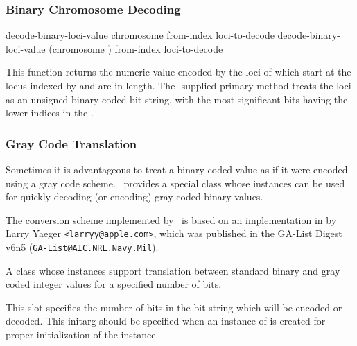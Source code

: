 {\filbreak
{\samepage
\subsubsection{Binary Chromosome Decoding}

\Defgeneric decode-binary-loci-value {chromosome from-index loci-to-decode}
 decode-binary-loci-value {(chromosome )
                                     from-index loci-to-decode}

This function returns the numeric value encoded by the loci of 
which start at the locus indexed by  and are  in
length. The \geco-supplied primary method treats the loci as an unsigned binary
coded bit string, with the most significant bits having the lower indices in the
.
\par}%
\filbreak


\subsubsection{Gray Code Translation}
	\label{section:gray-code-translation}

Sometimes it is advantageous to treat a binary coded value as if it were encoded
using a gray code scheme\cite{ga:gray-code-bias}. \Geco\ provides a special class
whose instances can be used for quickly decoding (or encoding) gray coded binary
values.

The conversion scheme implemented by \geco\ is based on an implementation in  by
Larry Yaeger \verb|<larryy@apple.com>|, which was published in the GA-List Digest v6n5
\hbox{(\verb|GA-List@AIC.NRL.Navy.Mil|).}

\filbreak
{\samepage
{}

A class whose instances support translation between standard binary and gray
coded integer values for a specified number of bits.
\par}%

\gap

\filbreak
{\samepage



This slot specifies the number of bits in the bit string which will be encoded or
decoded. This initarg should be specified when an instance of
 is created for proper initialization of the
instance.
\par}%

}
